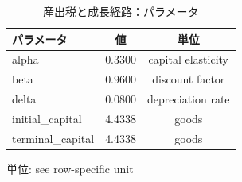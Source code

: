 \begingroup
\begin{table}[htbp]
\centering
\caption{産出税と成長経路：パラメータ}
\label{tab:specialist-growth-r01-displays-parameters}
\begin{tabular}{lcc}
\toprule
パラメータ & 値 & 単位 \\
\midrule
alpha & 0.3300 & capital elasticity \\
beta & 0.9600 & discount factor \\
delta & 0.0800 & depreciation rate \\
initial\_capital & 4.4338 & goods \\
terminal\_capital & 4.4338 & goods \\
\bottomrule
\end{tabular}
\par\medskip\begin{minipage}{\linewidth}\footnotesize
単位: see row-specific unit
\end{minipage}
\end{table}
\endgroup
